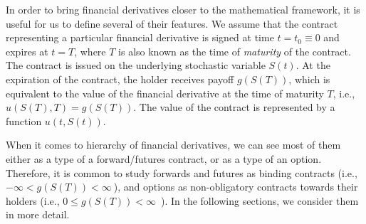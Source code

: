 \documentclass{UUThesisTemplate}
\begin{document}
\par In order to bring financial derivatives closer to the mathematical framework, it is useful for us to define several of their features. We assume that the contract representing a particular financial derivative is signed at time $t=t_0\equiv0$ and expires at $t=T$, where $T$ is also known as the time of \emph{maturity} of the contract. The contract is issued on the underlying stochastic variable $S(t)$. At the expiration of the contract, the holder receives payoff $g(S(T))$, which is equivalent to the value of the financial derivative at the time of maturity $T$, i.e., $u(S(T),T) = g(S(T))$. The value of the contract is represented by a function $u(t,S(t))$.
\par When it comes to hierarchy of financial derivatives, we can see most of them either as a type of a forward/futures contract, or as a type of an option. Therefore, it is common to study forwards and futures as binding contracts (i.e., $-\infty < g(S(T)) < \infty\ $), and options as non-obligatory contracts towards their holders (i.e., $0\leq g(S(T))<\infty$\ ). In the following sections, we consider them in more detail.
%
\end{document}
